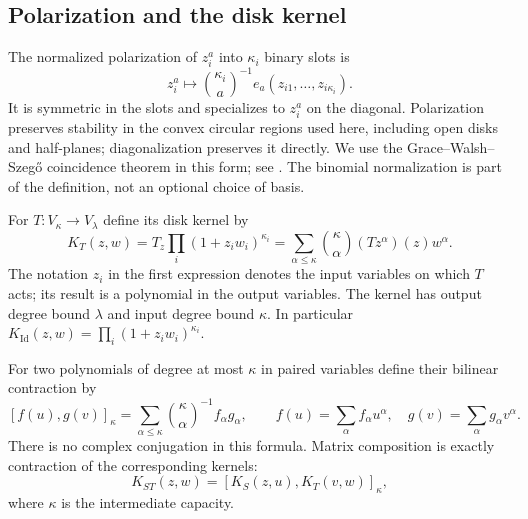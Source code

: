 \documentclass[reqno]{amsart}
\theoremstyle{definition}
\theoremstyle{remark}
\DeclareMathOperator{\Id}{Id}
\begin{document}
\subsection{Polarization and the disk kernel}
The normalized polarization of $z_i^a$ into $\kappa_i$ binary slots is
\[
 z_i^a\longmapsto
 \binom{\kappa_i}{a}^{-1}
 e_a(z_{i1},\ldots,z_{i\kappa_i}).
\]
It is symmetric in the slots and specializes to $z_i^a$ on the diagonal.
Polarization preserves stability in the convex circular regions used
here, including open disks and half-planes; diagonalization preserves
it directly. We use the Grace--Walsh--Szeg\H{o} coincidence
theorem in this form; see \cite{BB09,BB10II,BB09Circular}.
The binomial normalization is part of the definition, not an optional
choice of basis.\label{pre:polarization}

For $T:V_\kappa\to V_\lambda$ define its disk kernel by
\begin{equation}\label{pre:kernel}
 K_T(z,w)=T_z\prod_i(1+z_iw_i)^{\kappa_i}
 =\sum_{\alpha\leq\kappa}\binom{\kappa}{\alpha}
       (Tz^\alpha)(z)w^\alpha.
\end{equation}
The notation $z_i$ in the first expression denotes the input variables
on which $T$ acts; its result is a polynomial in the output variables.
The kernel has output degree bound $\lambda$ and input degree bound
$\kappa$. In particular $K_{\Id}(z,w)=\prod_i(1+z_iw_i)^{\kappa_i}$.

For two polynomials of degree at most $\kappa$ in paired variables define
their bilinear contraction by
\begin{equation}\label{pre:contraction}
 [f(u),g(v)]_\kappa
   =\sum_{\alpha\leq\kappa}
      \binom{\kappa}{\alpha}^{-1} f_\alpha g_\alpha,
 \qquad
 f(u)=\sum_\alpha f_\alpha u^\alpha,\quad
 g(v)=\sum_\alpha g_\alpha v^\alpha .
\end{equation}
There is no complex conjugation in this formula. Matrix composition is
exactly contraction of the corresponding kernels:
\[
 K_{ST}(z,w)=[K_S(z,u),K_T(v,w)]_\kappa,
\]
where $\kappa$ is the intermediate capacity.
\end{document}
